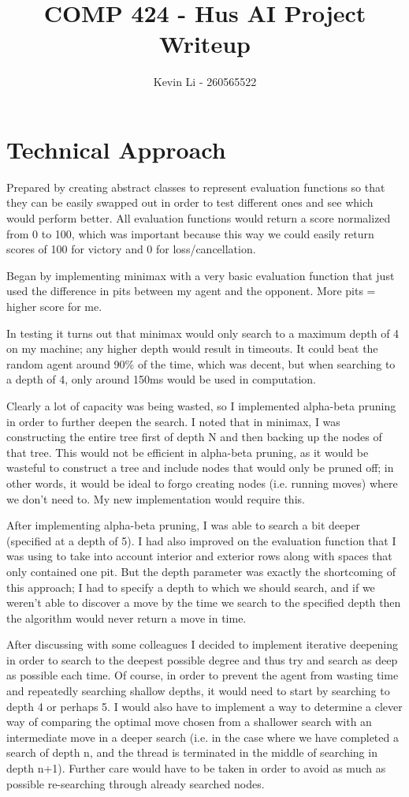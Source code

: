 \documentclass{article}
\title{COMP 424 - Hus AI Project Writeup}
\author{Kevin Li - 260565522}
\begin{document}
\maketitle
\newpage

\section{Technical Approach}

Prepared by creating abstract classes to represent evaluation functions so that they can be easily swapped out
in order to test different ones and see which would perform better. All evaluation functions would return a score normalized
from 0 to 100, which was important because this way we could easily return scores of 100 for victory and 0 for loss/cancellation.

Began by implementing minimax with a very basic evaluation function that just used the difference in pits between my agent and
the opponent. More pits = higher score for me.

In testing it turns out that minimax would only search to a maximum depth of 4 on my machine;
any higher depth would result in timeouts. It could beat the random agent around 90\% of the time, which was decent, but
when searching to a depth of 4, only around 150ms would be used in computation.

Clearly a lot of capacity was being wasted, so I implemented alpha-beta pruning in order to further deepen the search.
I noted that in minimax, I was constructing the entire tree first of depth N and then backing up the nodes of that tree. This would not
be efficient in alpha-beta pruning, as it would be wasteful to construct a tree and include nodes that would only be pruned off;
in other words, it would be ideal to forgo creating nodes (i.e. running moves) where we don't need to. My new implementation would
require this.

After implementing alpha-beta pruning, I was able to search a bit deeper (specified at a depth of 5). I had also improved on the evaluation function
that I was using to take into account interior and exterior rows along with spaces that only contained one pit. But the depth parameter was exactly the shortcoming
of this approach; I had to specify a depth to which we should search, and if we weren't able to discover a move by the time we search to the specified depth then
the algorithm would never return a move in time.

After discussing with some colleagues I decided to implement iterative deepening in order to search to the deepest
possible degree and thus try and search as deep as possible each time. Of course, in order to prevent the agent from wasting time and repeatedly searching shallow depths,
it would need to start by searching to depth 4 or perhaps 5. I would also have to implement a way to determine a clever way of comparing the optimal move chosen from
a shallower search with an intermediate move in a deeper search (i.e. in the case where we have completed a search of depth n, and the thread is terminated in the middle
of searching in depth n+1). Further care would have to be taken in order to avoid as much as possible re-searching through already searched nodes.
\end{document}
